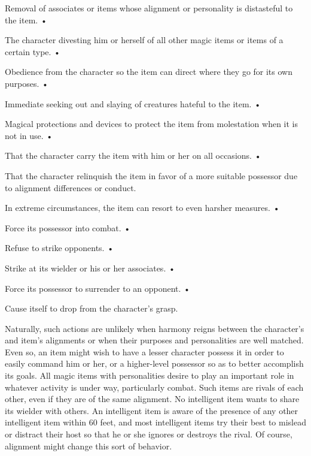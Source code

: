 \documentclass{article}
\begin{document}
\parindent=3pt
Removal of associates or items whose alignment or personality is distasteful to 
the item. • 

The character divesting him or herself of all other magic items or items of a certain 
type. • 

\parindent=7pt
Obedience from the character so the item can direct where they go for its own purposes. 
• 

\parindent=3pt
Immediate seeking out and slaying of creatures hateful to the item. • 

Magical protections and devices to protect the item from molestation when it is 
not in use. • 

\parindent=7pt
That the character carry the item with him or her on all occasions. • 

\parindent=3pt
That the character relinquish the item in favor of a more suitable possessor due 
to alignment differences or conduct. 

\vspace{12pt}
\parindent=0pt
In extreme circumstances, the item can resort to even harsher measures. • 

\parindent=3pt
Force its possessor into combat. • 

Refuse to strike opponents. • 

\parindent=7pt
Strike at its wielder or his or her associates. • 

\parindent=3pt
Force its possessor to surrender to an opponent. • 

Cause itself to drop from the character's grasp. 

\vspace{12pt}
Naturally, such actions are unlikely when harmony reigns between the character's 
and item's alignments or when their purposes and personalities are well matched. 
Even so, an item might wish to have a lesser character possess it in order to easily 
command him or her, or a higher-level possessor so as to better accomplish its 
goals. All magic items with personalities desire to play an important role in whatever 
activity is under way, particularly combat. Such items are rivals of each other, 
even if they are of the same alignment. No intelligent item wants to share its 
wielder with others. An intelligent item is aware of the presence of any other 
intelligent item within 60 feet, and most intelligent items try their best to mislead 
or distract their host so that he or she ignores or destroys the rival. Of course, 
alignment might change this sort of behavior. 
\end{document}
